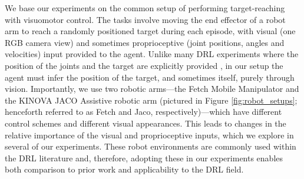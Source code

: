 \label{sec:environments}

We base our experiments on the common setup of performing
target-reaching with visuomotor control. The tasks involve moving the
end effector of a robot arm to reach a randomly positioned target during
each episode, with visual (one RGB camera view) and sometimes
proprioceptive (joint positions, angles and velocities) input provided
to the agent. Unlike many DRL experiments where the position of the
joints and the target are explicitly provided \cite{plappert2018multi},
in our setup the agent must infer the position of the target, and
sometimes itself, purely through vision. Importantly, we use two robotic
arms---the Fetch Mobile Manipulator and the KINOVA JACO Assistive
robotic arm (pictured in Figure \ref{fig:robot_setups}; henceforth
referred to as Fetch and Jaco, respectively)---which have different
control schemes and different visual appearances. This leads to changes
in the relative importance of the visual and proprioceptive inputs,
which we explore in several of our experiments. These robot environments
are commonly used within the DRL literature
\cite{andrychowicz2017hindsight, gu2017deep, rusu2017sim} and,
therefore, adopting these in our experiments enables both comparison to
prior work and applicability to the DRL field.


